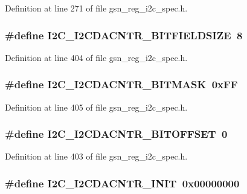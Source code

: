Definition at line 271 of file gsn\_\-reg\_\-i2c\_\-spec.h.

\hypertarget{a00558_aacf79a0093235b7f25a673b39eb489b7}{
\subsubsection[{I2C\_\-I2CDACNTR\_\-BITFIELDSIZE}]{\setlength{\rightskip}{0pt plus 5cm}\#define I2C\_\-I2CDACNTR\_\-BITFIELDSIZE~8}}
\label{a00558_aacf79a0093235b7f25a673b39eb489b7}


Definition at line 404 of file gsn\_\-reg\_\-i2c\_\-spec.h.

\hypertarget{a00558_a78691e1166babd1c5ba9faa2f7f2a881}{
\subsubsection[{I2C\_\-I2CDACNTR\_\-BITMASK}]{\setlength{\rightskip}{0pt plus 5cm}\#define I2C\_\-I2CDACNTR\_\-BITMASK~0xFF}}
\label{a00558_a78691e1166babd1c5ba9faa2f7f2a881}


Definition at line 405 of file gsn\_\-reg\_\-i2c\_\-spec.h.

\hypertarget{a00558_a8a699129a4ad89c14f2ce6a05f9e5fd4}{
\subsubsection[{I2C\_\-I2CDACNTR\_\-BITOFFSET}]{\setlength{\rightskip}{0pt plus 5cm}\#define I2C\_\-I2CDACNTR\_\-BITOFFSET~0}}
\label{a00558_a8a699129a4ad89c14f2ce6a05f9e5fd4}


Definition at line 403 of file gsn\_\-reg\_\-i2c\_\-spec.h.

\hypertarget{a00558_a2796c4156e07d98303c68dce6646f043}{
\subsubsection[{I2C\_\-I2CDACNTR\_\-INIT}]{\setlength{\rightskip}{0pt plus 5cm}\#define I2C\_\-I2CDACNTR\_\-INIT~0x00000000}}
\label{a00558_a2796c4156e07d98303c68dce6646f043}


